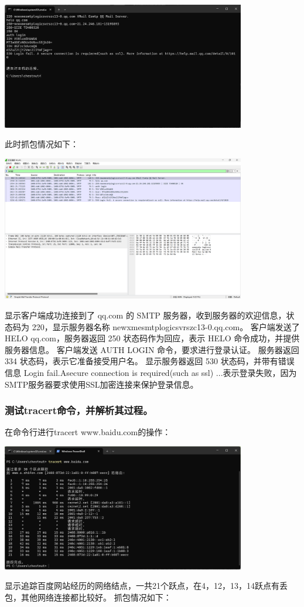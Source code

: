 \documentclass{article}
\begin{document}
\vspace{10pt}
\centerline{\includegraphics[width=0.8\textwidth]{1_1_images/16.png}}
\vspace{10pt}
此时抓包情况如下：

\vspace{10pt}
\centerline{\includegraphics[width=0.8\textwidth]{1_1_images/17.png}}
\vspace{10pt}
显示客户端成功连接到了 qq.com 的 SMTP 服务器，收到服务器的欢迎信息，状态码为 220，显示服务器名称 newxmesmtplogicsvrszc13-0.qq.com。
客户端发送了 HELO qq.com，服务器返回 250 状态码作为回应，表示 HELO 命令成功，并提供服务器信息。
客户端发送 AUTH LOGIN 命令，要求进行登录认证。
服务器返回 334 状态码，表示它准备接受用户名。
显示服务器返回 530 状态码，并带有错误信息 Login fail.Asecure connection is required(such as ssl) ...表示登录失败，因为SMTP服务器要求使用SSL加密连接来保护登录信息。

\subsubsection{测试tracert命令，并解析其过程。}
在命令行进行tracert www.baidu.com的操作：

\vspace{10pt}
\centerline{\includegraphics[width=0.8\textwidth]{1_1_images/18.png}}
\vspace{10pt}
显示追踪百度网站经历的网络结点，一共21个跃点，在4，12，13，14跃点有丢包，其他网络连接都比较好。
抓包情况如下：
\end{document}
